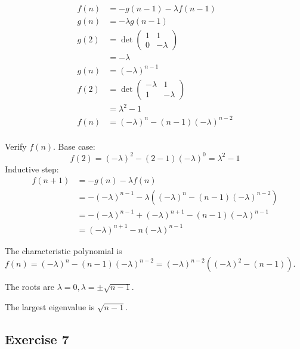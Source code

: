 \documentclass{article}
\begin{document}
\begin{align*}
  f(n) &= -g(n - 1) - \lambda f(n - 1) \\
  g(n) &= -\lambda g(n - 1) \\
  g(2) &= \det
  \begin{pmatrix}
    1 & 1 \\
    0 & -\lambda 
  \end{pmatrix} \\
  &= -\lambda \\
  g(n) &= (-\lambda)^{n - 1} \\
  f(2) &= \det
  \begin{pmatrix}
    -\lambda & 1 \\
    1 & -\lambda
  \end{pmatrix} \\
  &= \lambda^2 - 1 \\
  f(n) &= (-\lambda)^n - (n - 1) (-\lambda)^{n - 2} \\
\end{align*}

Verify \( f(n) \). Base case:
\[ f(2) = (-\lambda)^2 - (2 - 1) (-\lambda)^{0} = \lambda^2 - 1 \]
Inductive step:
\begin{align*}
  f(n + 1) &= -g(n) - \lambda f(n) \\
  &= -(-\lambda)^{n - 1} - \lambda ((-\lambda)^n - (n - 1) (-\lambda)^{n - 2}) \\
  &= -(-\lambda)^{n - 1} + (-\lambda)^{n + 1} - (n - 1) (-\lambda)^{n - 1} \\
  &= (-\lambda)^{n + 1} - n (-\lambda)^{n - 1}
\end{align*}

The characteristic polynomial is \( f(n) = (-\lambda)^n - (n - 1) (-\lambda)^{n - 2} = (-\lambda)^{n - 2} ((-\lambda)^2 - (n - 1)) \).

The roots are \( \lambda = 0, \lambda = \pm \sqrt{n - 1} \).

The largest eigenvalue is \( \boxed{\sqrt{n - 1}} \).

\newpage

\subsection*{Exercise 7}
\end{document}
